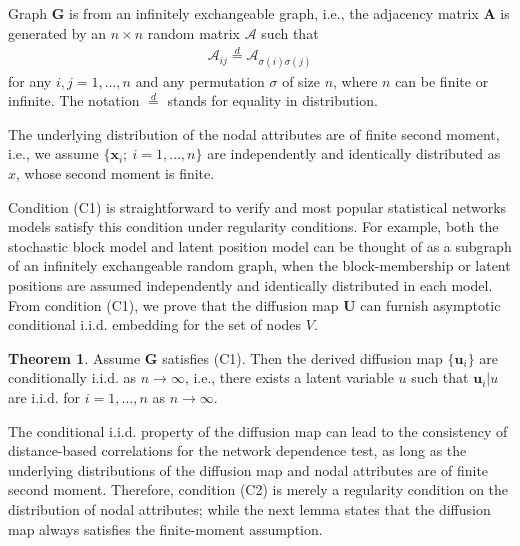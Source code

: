 \documentclass[12pt]{article}
\theoremstyle{definition}
\newtheorem{theorem}{Theorem}
\begin{document}
	\begin{description}[align=left]
		\item [(C1)] Graph $\mathbf{G}$ is from an infinitely exchangeable graph, i.e., the adjacency matrix $\mathbf{A}$ is generated by an $n \times n$ random matrix $\mathcal{A}$ such that 
		\begin{align*}
			\mathcal{A}_{ij} \stackrel{d}{=} \mathcal{A}_{\sigma(i) \sigma(j)}
		\end{align*}
		for any $i,j=1,\ldots,n$ and any permutation $\sigma$ of size $n$, where $n$ can be finite or infinite. The notation $\stackrel{d}{=}$ stands for equality in distribution. 
		
		\item [(C2)] The underlying distribution of the nodal attributes are of finite second moment, i.e., we assume $\{\mathbf{x}_{i};~i=1,\ldots,n\}$ are independently and identically distributed as $x$, whose second moment is finite.
	\end{description}
	
	Condition (C1) is straightforward to verify and most popular statistical networks models satisfy this condition under regularity conditions. For example, both the stochastic block model and latent position model can be thought of as a subgraph of an infinitely exchangeable random graph, when the block-membership or latent positions are assumed independently and identically distributed in each model. From condition (C1), we prove that the diffusion map $\mathbf{U}$ can furnish asymptotic conditional i.i.d. embedding for the set of nodes $V$. 
	
	\begin{theorem}
		\label{main_lemma}
		Assume $\mathbf{G}$ satisfies (C1). Then the derived diffusion map $\{ \mathbf{u}_{i}\}$ are conditionally i.i.d. as $n \rightarrow \infty$,  i.e., there exists a latent variable $u$ such that $\mathbf{u}_{i}|u$ are i.i.d. for $i=1,\ldots,n$ as $n \rightarrow \infty$.  
	\end{theorem} 
	
	The conditional i.i.d. property of the diffusion map can lead to the consistency of distance-based correlations for the network dependence test, as long as the underlying distributions of the diffusion map and nodal attributes are of finite second moment. Therefore, condition (C2) is merely a regularity condition on the distribution of nodal attributes; while the next lemma states that the diffusion map always satisfies the finite-moment assumption.
	
\end{document}
